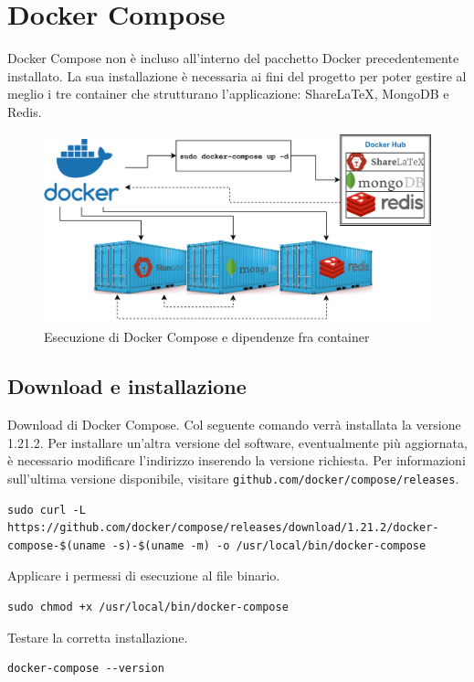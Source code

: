 \section{Docker Compose}
Docker Compose non è incluso all'interno del pacchetto Docker precedentemente installato. La sua installazione è necessaria ai fini del progetto per poter gestire al meglio i tre container che strutturano l'applicazione: ShareLaTeX, MongoDB e Redis.
\begin{figure}[h]
    \centering
    \includegraphics[scale=0.1]{immagini/docker_container_dependencies.png}
    \caption{Esecuzione di Docker Compose e dipendenze fra container}
    \label{fig:docker_compose_dipendenze}
\end{figure}

\subsection{Download e installazione}
Download di Docker Compose. Col seguente comando verrà installata la versione 1.21.2. Per installare un'altra versione del software, eventualmente più aggiornata, è necessario modificare l'indirizzo inserendo la versione richiesta. Per informazioni sull'ultima versione disponibile, visitare \verb|github.com/docker/compose/releases|.
\begin{lstlisting}
sudo curl -L https://github.com/docker/compose/releases/download/1.21.2/docker-compose-$(uname -s)-$(uname -m) -o /usr/local/bin/docker-compose
\end{lstlisting}
Applicare i permessi di esecuzione al file binario.
\begin{lstlisting}
sudo chmod +x /usr/local/bin/docker-compose
\end{lstlisting}
Testare la corretta installazione.
\begin{lstlisting}
docker-compose --version
\end{lstlisting}

